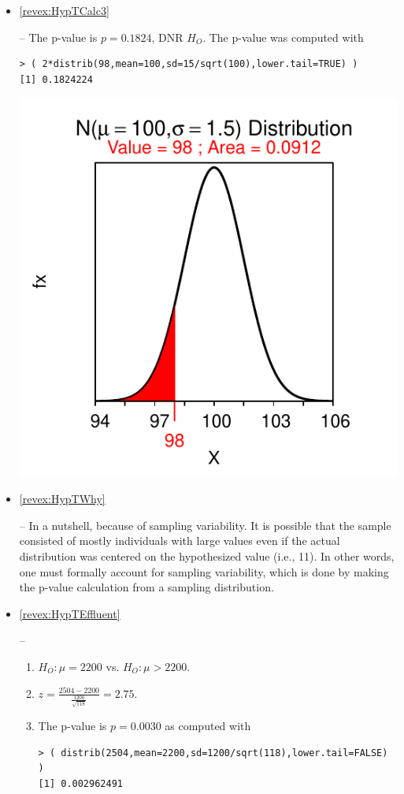 \documentclass[10pt,openany]{book}\usepackage[]{graphicx}\usepackage[]{color}
\makeatletter
\newenvironment{kframe}{%
 \def\at@end@of@kframe{}%
 \ifinner\ifhmode%
  \def\at@end@of@kframe{\end{minipage}}%
  \begin{minipage}{\columnwidth}%
 \fi\fi%
 \def\FrameCommand##1{\hskip\@totalleftmargin \hskip-\fboxsep
 \colorbox{shadecolor}{##1}\hskip-\fboxsep
     \hskip-\linewidth \hskip-\@totalleftmargin \hskip\columnwidth}%
 \MakeFramed {\advance\hsize-\width
   \@totalleftmargin\z@ \linewidth\hsize
   \@setminipage}}%
 {\par\unskip\endMakeFramed%
 \at@end@of@kframe}
\newenvironment{knitrout}{}{} %
\makeatother
\begin{document}
\begin{itemize}
\begin{knitrout}
{}



\end{knitrout}
  \item \hypertarget{ans:HypTCalc3}{\ref{revex:HypTCalc3}} -- The p-value is $p=0.1824$, DNR $H_{O}$.  The p-value was computed with
\begin{knitrout}
\color{fgcolor}\begin{kframe}
\begin{verbatim}
> ( 2*distrib(98,mean=100,sd=15/sqrt(100),lower.tail=TRUE) )
[1] 0.1824224
\end{verbatim}
\end{kframe}

{\centering \includegraphics[width=.4\linewidth]{Figs/HypTCalc3-1} 

}



\end{knitrout}
  \item \hypertarget{ans:HypTWhy}{\ref{revex:HypTWhy}} -- In a nutshell, because of sampling variability.  It is possible that the sample consisted of mostly individuals with large values even if the actual distribution was centered on the hypothesized value (i.e., 11).  In other words, one must formally account for sampling variability, which is done by making the p-value calculation from a sampling distribution.

  \item \hypertarget{ans:HypTEffluent}{\ref{revex:HypTEffluent}} --
    \begin{enumerate}
      \item $H_{O}:\mu=2200$ vs. $H_{O}:\mu>2200$.
      \item $z=\frac{2504-2200}{\frac{1200}{\sqrt{118}}}=2.75$.
      \item The p-value is $p=0.0030$ as computed with
\begin{knitrout}
\color{fgcolor}\begin{kframe}
\begin{verbatim}
> ( distrib(2504,mean=2200,sd=1200/sqrt(118),lower.tail=FALSE) )
[1] 0.002962491
\end{verbatim}
\end{kframe}


\end{knitrout}
\end{enumerate}
\end{itemize}
\end{document}

